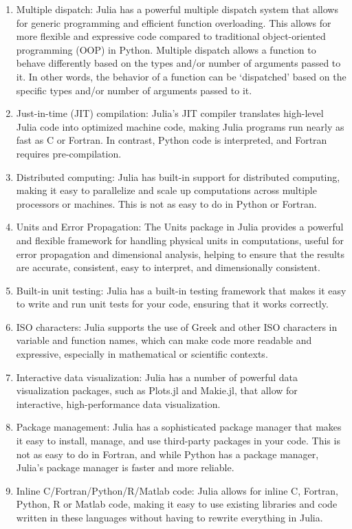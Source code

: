 \begin{enumerate}
    \item Multiple dispatch: Julia has a powerful multiple dispatch system that allows for generic programming and efficient function overloading. This allows for more flexible and expressive code compared to traditional object-oriented programming (OOP) in Python. Multiple dispatch allows a function to behave differently based on the types and/or number of arguments passed to it. In other words, the behavior of a function can be \lq dispatched' based on the specific types and/or number of arguments passed to it.
    \item Just-in-time (JIT) compilation: Julia's JIT compiler translates high-level Julia code into optimized machine code, making Julia programs run nearly as fast as C or Fortran. In contrast, Python code is interpreted, and Fortran requires pre-compilation.
    \item Distributed computing: Julia has built-in support for distributed computing, making it easy to parallelize and scale up computations across multiple processors or machines. This is not as easy to do in Python or Fortran.
    \item Units and Error Propagation: The Units package in Julia provides a powerful and flexible framework for handling physical units in computations, useful for error propagation and dimensional analysis, helping to ensure that the results are accurate, consistent, easy to interpret, and dimensionally consistent. 
    \item Built-in unit testing: Julia has a built-in testing framework that makes it easy to write and run unit tests for your code, ensuring that it works correctly.
    \item ISO characters: Julia supports the use of Greek and other ISO characters in variable and function names, which can make code more readable and expressive, especially in mathematical or scientific contexts.
    \item Interactive data visualization: Julia has a number of powerful data visualization packages, such as Plots.jl and Makie.jl, that allow for interactive, high-performance data visualization.
    \item Package management: Julia has a sophisticated package manager that makes it easy to install, manage, and use third-party packages in your code. This is not as easy to do in Fortran, and while Python has a package manager, Julia's package manager is faster and more reliable.
    \item Inline C/Fortran/Python/R/Matlab code: Julia allows for inline C, Fortran, Python, R or Matlab code, making it easy to use existing libraries and code written in these languages without having to rewrite everything in Julia.
\end{enumerate}


